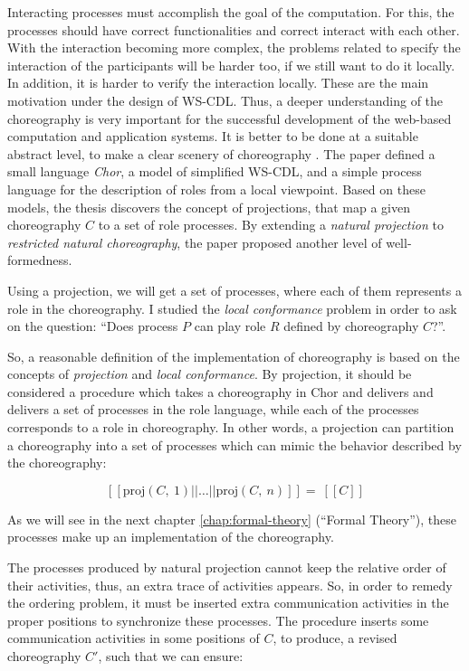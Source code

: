 Interacting processes must accomplish the goal of the computation. For this, the processes should have correct functionalities and correct interact with each other. With the interaction becoming more complex, the problems related to specify the interaction of the participants will be harder too, if we still want to do it locally.  In addition, it is harder to verify the interaction locally. These are the main motivation under the design of WS-CDL. Thus, a deeper understanding of the choreography is very important for the successful development of the web-based computation and application systems. It is better to be done at a suitable abstract level, to make a clear scenery of choreography \cite{essence-choreography}. The paper \cite{essence-choreography} defined a small language \textit{Chor}, a model of simplified WS-CDL, and a simple process language for the description of roles from a local viewpoint. Based on these models, the thesis discovers the concept of projections, that map a given choreography $C$ to a set of role processes. By extending a \textit{natural projection} to \textit{restricted natural choreography}, the paper \cite{essence-choreography} proposed another level of well-formedness.

Using a projection, we will get a set of processes, where each of them represents a role in the choreography. I studied the \textit{local conformance} problem in order to ask on the question: ``Does process $P$ can play role $R$ defined by choreography $C$?''.

So, a reasonable definition of the implementation of choreography is based on the concepts of \textit{projection} and \textit{local conformance}. By projection, it should be considered a procedure which takes a choreography in Chor and delivers and delivers a set of processes in the role language, while each of the processes corresponds to a role in choreography. In other words, a projection can partition a choreography into a set of processes which can mimic the behavior described by the choreography:

\begin{equation}
    \left[\left[\text{proj}\left(C,\ 1\right)||\dots || \text{proj}\left(C,\ n\right)\right]\right]=\ \left[\left[C\right]\right]
\end{equation}

As we will see in the next chapter \ref{chap:formal-theory} (``Formal Theory''), these processes make up an implementation of the choreography. 

The processes produced by natural projection cannot keep the relative order of their activities, thus, an extra trace of activities appears. So, in order to remedy the ordering problem, it must be inserted extra communication activities in the proper positions to synchronize these processes. The procedure inserts some communication activities in some positions of $C$, to produce, a revised choreography $C'$, such that we can ensure:

